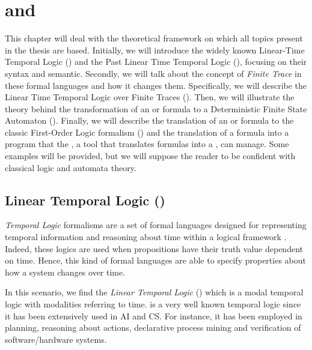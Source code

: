 \chapter{\PLTL and \LTLf}
This chapter will deal with the theoretical framework on which all topics present in the thesis are based. Initially, we will introduce the widely known Linear-Time Temporal Logic (\LTL) and the Past Linear Time Temporal Logic (\PLTL), focusing on their syntax and semantic. Secondly, we will talk about the concept of \textit{Finite Trace} in these formal languages and how it changes them. Specifically, we will describe the Linear Time Temporal Logic over Finite Traces (\LTLf). Then, we will illustrate the theory behind the transformation of an \LTLf or \PLTL formula to a Deterministic Finite State Automaton (\DFA). Finally, we will describe the translation of an \LTLf or \PLTL formula to the classic First-Order Logic formalism (\FOL) and the translation of a \FOL formula into a program that the \MONA, a tool that translates formulas into a \DFA, can manage. Some examples will be provided, but we will suppose the reader to be confident with classical logic and automata theory.
\section{Linear Temporal Logic (\LTL)}
\textit{Temporal Logic} formalisms are a set of formal languages designed for representing temporal information and reasoning about time within a logical framework \citep{sep-logic-temporal}. Indeed, these logics are used when propositions have their truth value dependent on time. Hence, this kind of formal languages are able to specify properties about how a system changes over time.

In this scenario, we find the \textit{Linear Temporal Logic} (\LTL) \citep{Pnueli:1977:TLP:1382431.1382534} which is a modal temporal logic with modalities referring to time. \LTL is a very well known temporal logic since it has been extensively used in AI and CS. For instance, it has been employed in planning, reasoning about actions, declarative process mining and verification of software/hardware systems.
